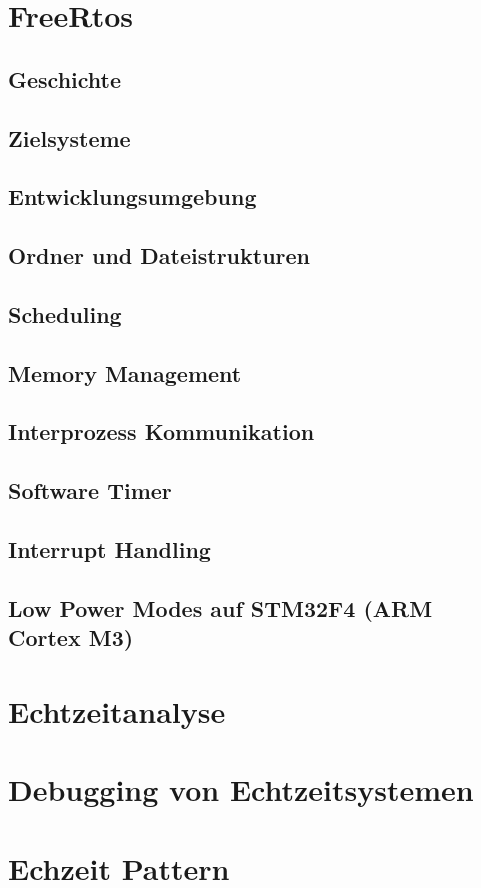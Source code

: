 \documentclass[ngerman]{seminarvorlage}
\begin{document}
\section{FreeRtos} 
\subsection{Geschichte}
\subsection{Zielsysteme}
\subsection{Entwicklungsumgebung}
\subsection{Ordner und Dateistrukturen} 
\subsection{Scheduling}
\subsection{Memory Management}
\subsection{Interprozess Kommunikation}
\subsection{Software Timer}
\subsection{Interrupt Handling}
\subsection{Low Power Modes auf STM32F4 (ARM Cortex M3)}
\label{sec:Low Power Modes} 
\section{Echtzeitanalyse}
\label{sec:Echtzeitanalyse} 
\section{Debugging von Echtzeitsystemen} 
\section{Echzeit Pattern} 
\end{document}
